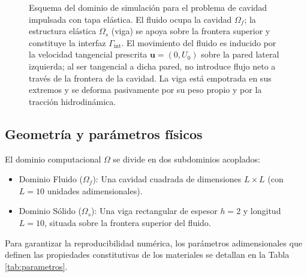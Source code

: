 \documentclass[12pt, letterpaper]{report}
\theoremstyle{definition}
\begin{document}
\begin{figure}[H]
\caption{Esquema del dominio de simulación para el problema de cavidad impulsada con tapa elástica. El fluido ocupa la cavidad $\Omega_f$; la estructura elástica $\Omega_s$ (viga) se apoya sobre la frontera superior y constituye la interfaz $\Gamma_{\text{int}}$. El movimiento del fluido es inducido por la velocidad tangencial prescrita $\mathbf{u} = (0, U_0)$ sobre la pared lateral izquierda; al ser tangencial a dicha pared, no introduce flujo neto a través de la frontera de la cavidad. La viga está empotrada en sus extremos y se deforma pasivamente por su peso propio y por la tracción hidrodinámica.}
\label{figxxesquemadominio}
\end{figure}

\subsection{Geometría y parámetros físicos}

El dominio computacional $\Omega$ se divide en dos subdominios acoplados:
\begin{itemize}
    \item Dominio Fluido ($\Omega_f$): Una cavidad cuadrada de dimensiones $L \times L$ (con $L=10$ unidades adimensionales).
    \item Dominio Sólido ($\Omega_s$): Una viga rectangular de espesor $h=2$ y longitud $L=10$, situada sobre la frontera superior del fluido.
\end{itemize}

Para garantizar la reproducibilidad numérica, los parámetros adimensionales que definen las propiedades constitutivas de los materiales se detallan en la Tabla \ref{tab:parametros}.
\end{document}
